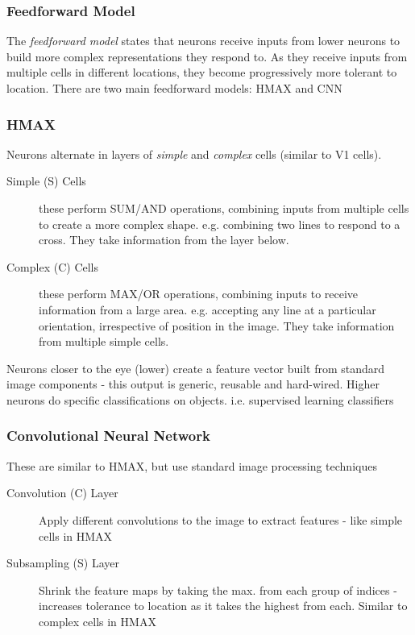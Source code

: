 \subsubsection{Feedforward Model}
The \emph{feedforward model} states that neurons receive inputs from lower neurons to build more complex representations they respond to. As they receive inputs from multiple cells in different locations, they become progressively more tolerant to location. There are two main feedforward models: HMAX and CNN

\subsubsection{HMAX}
Neurons alternate in layers of \emph{simple} and \emph{complex} cells (similar to V1 cells). 
\begin{description}
    \item[Simple (S) Cells] these perform SUM/AND operations, combining inputs from multiple cells to create a more complex shape. e.g. combining two lines to respond to a cross. They take information from the layer below.
    \item[Complex (C) Cells] these perform MAX/OR operations, combining inputs to receive information from a large area. e.g. accepting any line at a particular orientation, irrespective of position in the image. They take information from multiple simple cells.
\end{description}
Neurons closer to the eye (lower) create a feature vector built from standard image components - this output is generic, reusable and hard-wired. Higher neurons do specific classifications on objects. i.e. supervised learning classifiers 

\subsubsection{Convolutional Neural Network}
These are similar to HMAX, but use standard image processing techniques
\begin{description}
    \item[Convolution (C) Layer] Apply different convolutions to the image to extract features - like simple cells in HMAX
    \item[Subsampling (S) Layer] Shrink the feature maps by taking the max. from each group of indices - increases tolerance to location as it takes the highest from each. Similar to complex cells in HMAX 
\end{description}

